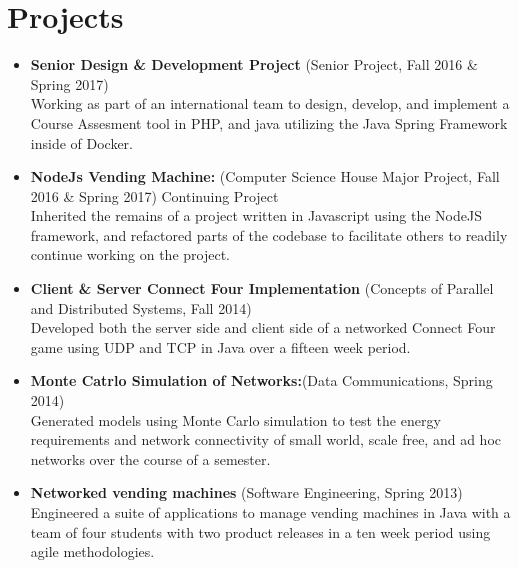 \documentclass[10pt]{Article}
\begin{document}
\section*{Projects}
\begin{itemize}[topsep=1ex, itemsep=.5ex, parsep=0ex, partopsep=.75ex]
	\item[]{\bf Senior Design \& Development Project} (Senior Project, Fall 2016 \& Spring 2017)\\
	Working as part of an international team to design, develop, and implement a Course Assesment tool in PHP, and java utilizing the Java Spring Framework inside of Docker.
	\item[]{\bf NodeJs Vending Machine:} (Computer Science House Major Project, Fall 2016 \& Spring 2017) Continuing Project\\
	Inherited the remains of a project written in Javascript using the NodeJS framework, and refactored parts of the codebase to facilitate others to readily continue working on the project.
	\item[]{\bf Client \& Server Connect Four Implementation} (Concepts of Parallel and Distributed Systems, Fall 2014)\\
  Developed both the server side and client side of a networked Connect Four game using UDP and TCP in Java over a fifteen week period.
	\item[]{\bf Monte Catrlo Simulation of Networks:}(Data Communications, Spring 2014)\\
	Generated models using Monte Carlo simulation to test the energy requirements and network connectivity of small world, scale free, and ad hoc networks over the course of a semester.
	\item[]{\bf Networked vending machines} (Software Engineering, Spring 2013)\\
	Engineered a suite of applications to manage vending machines in Java with a team of four students with two product releases in a ten week period using agile methodologies.
\end{itemize}
\end{document}
